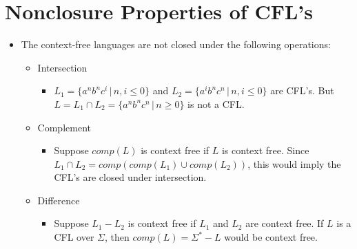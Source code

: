 \documentclass[]{article}
\begin{document}
\section{Nonclosure Properties of CFL's}
  \begin{itemize}
    \item The context-free languages are not closed under the following operations:
      \begin{itemize}
        \item Intersection
          \begin{itemize}
            \item $L_1 = \{ a^nb^nc^i \, | \,n, i \leq 0 \}$ and 
            $L_2 = \{ a^ib^nc^n \, | \, n, i \leq 0 \}$ are CFL's. But
            $L = L_1 \cap L_2 = \{a^nb^nc^n \, | \, n \geq 0 \}$ is not a CFL.
          \end{itemize}
        \item Complement
          \begin{itemize}
            \item Suppose $comp(L)$ is context free if $L$ is context free. 
            Since $L_1 \cap L_2 = comp(comp(L_1) \cup comp(L_2))$, this would
            imply the CFL's are closed under intersection.
          \end{itemize}
        \item Difference
          \begin{itemize}
            \item Suppose $L_1 - L_2$ is context free if $L_1$ and $L_2$ are 
            context free. If $L$ is a CFL over $\Sigma$, then 
            $comp(L) = \Sigma^* - L$ would be context free.
          \end{itemize}
      \end{itemize}
  \end{itemize}
  
\end{document}

